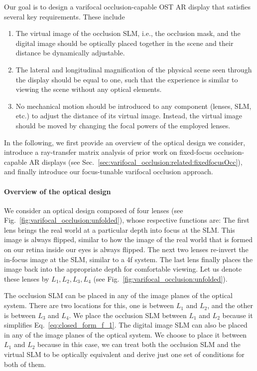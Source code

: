 
Our goal is to design a varifocal occlusion-capable OST AR display that satisfies several key requirements. These include 
%
\begin{enumerate}
    \item The virtual image of the occlusion SLM, i.e., the occlusion mask, and the digital image should be optically placed together in the scene and their distance be dynamically adjustable.
    \item The lateral and longitudinal magnification of the physical scene seen through the display should be equal to one, such that the experience is similar to viewing the scene without any optical elements.
    \item No mechanical motion should be introduced to any component (lenses, SLM, etc.) to adjust the distance of its virtual image. Instead, the virtual image should be moved by changing the focal powers of the employed lenses.
\end{enumerate}
%

In the following, we first provide an overview of the optical design we consider, introduce a ray-transfer matrix analysis of prior work on fixed-focus occlusion-capable AR displays (see Sec.~\ref{sec:varifocal_occlusion:related:fixedfocusOcc}), and finally introduce our focus-tunable varifocal occlusion approach.

\paragraph{\textbf{Overview of the optical design}}
We consider an optical design composed of four lenses (see Fig.~\ref{fig:varifocal_occlusion:unfolded}), whose respective functions are: The first lens brings the real world at a particular depth into focus at the SLM. This image is always flipped, similar to how the image of the real world that is formed on our retina inside our eyes is always flipped. The next two lenses re-invert the in-focus image at the SLM, similar to a 4f system. The last lens finally places the image back into the appropriate depth for comfortable viewing. Let us denote these lenses by $L_1,L_2,L_3,L_4$ (see Fig.~\ref{fig:varifocal_occlusion:unfolded}).

The occlusion SLM can be placed in any of the image planes of the optical system. There are two locations for this, one is between $L_1$ and $L_2$, and the other is between $L_3$ and $L_4$. We place the occlusion SLM between $L_1$ and $L_2$ because it simplifies Eq.~\eqref{eq:closed_form_f_1}. The digital image SLM can also be placed in any of the image planes of the optical system. We choose to place it between $L_1$ and $L_2$ because in this case, we can treat both the occlusion SLM and the virtual SLM to be optically equivalent and derive just one set of conditions for both of them.

